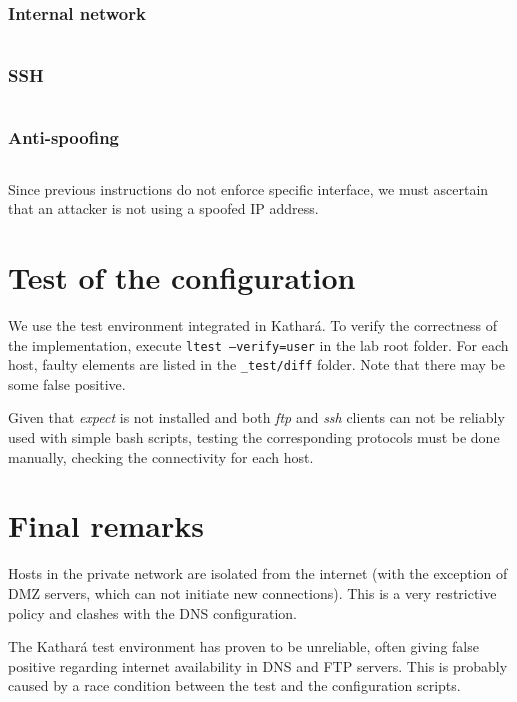 \documentclass{homework}
\newcommand{\kat}{Kathará\xspace}
\begin{document}
    \subsubsection{Internal network}
    \inputminted[breakindent=3em, breaklines]{sh}{intfw/internal}
    
    \subsubsection{SSH}
    \inputminted[breakindent=3em, breaklines]{sh}{intfw/ssh}
    
    \subsubsection{Anti-spoofing}
    \inputminted[breakindent=3em, breaklines]{sh}{intfw/spoofing}
    Since previous instructions do not enforce specific interface, we must ascertain that an attacker is not using a spoofed IP address.
    
    
    \section{Test of the configuration}
    We use the test environment integrated in \kat.
    To verify the correctness of the implementation, execute \texttt{ltest --verify=user} in the lab root folder.
    For each host, faulty elements are listed in the \texttt{\_test/diff} folder.
    Note that there may be some false positive.
    
    Given that \textit{expect} is not installed and both \textit{ftp} and \textit{ssh} clients can not be reliably used with simple bash scripts, testing the corresponding protocols must be done manually, checking the connectivity for each host.
    
    
    \section{Final remarks}
    Hosts in the private network are isolated from the internet (with the exception of DMZ servers, which can not initiate new connections).
    This is a very restrictive policy and clashes with the DNS configuration.
    
    The \kat test environment has proven to be unreliable, often giving false positive regarding internet availability in DNS and FTP servers.
    This is probably caused by a race condition between the test and the configuration scripts.
\end{document}
